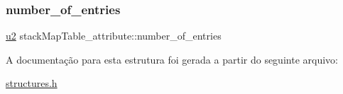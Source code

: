 \subsubsection{\texorpdfstring{number\+\_\+of\+\_\+entries}{number\_of\_entries}}
{\footnotesize\ttfamily \hyperlink{lista__operandos_8h_a732cde1300aafb73b0ea6c2558a7a54f}{u2} stack\+Map\+Table\+\_\+attribute\+::number\+\_\+of\+\_\+entries}



A documentação para esta estrutura foi gerada a partir do seguinte arquivo\+:\begin{DoxyCompactItemize}
\item 
\hyperlink{structures_8h}{structures.\+h}\end{DoxyCompactItemize}
